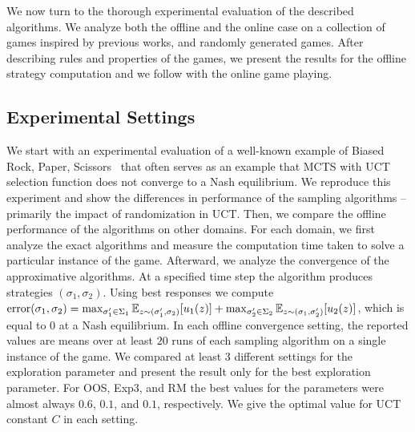 
We now turn to the thorough experimental evaluation of the described algorithms.
We analyze both the offline and the online case on a collection of games inspired by previous works, and randomly generated games.
After describing rules and properties of the games, we present the results for the offline strategy computation and we follow with the online game playing.

\subsection{Experimental Settings}

We start with an experimental evaluation of a well-known example of Biased Rock, Paper, Scissors~\cite{Shafiei09} that often serves
as an example that MCTS with UCT selection function does not converge to a Nash equilibrium.
We reproduce this experiment and show the differences in performance of the sampling algorithms -- primarily the impact of randomization in UCT.
Then, we compare the offline performance of the algorithms on other domains.
For each domain, we first analyze the exact algorithms and measure the computation time taken to solve a particular instance of the game.
Afterward, we analyze the convergence of the approximative algorithms.
At a specified time step the algorithm produces strategies $(\sigma_1,\sigma_2)$. Using best responses we compute
$\textrm{error}(\sigma_1,\sigma_2) = \max_{\sigma_1' \in \Sigma_1} \mathbb{E}_{z \sim (\sigma_1',\sigma_2)}[u_1(z)]
                                   + \max_{\sigma_2' \in \Sigma_2} \mathbb{E}_{z \sim (\sigma_1,\sigma_2')}[u_2(z)]$,
which is equal to $0$ at a Nash equilibrium.
In each offline convergence setting, the reported values are means over at least $20$ runs of each sampling algorithm on a single instance of the game.
We compared at least $3$ different settings for the exploration parameter and present the result only for the best exploration parameter.
For OOS, Exp3, and RM the best values for the parameters were almost always $0.6$, $0.1$, and $0.1$, respectively.
We give the optimal value for UCT constant $C$ in each setting. 

